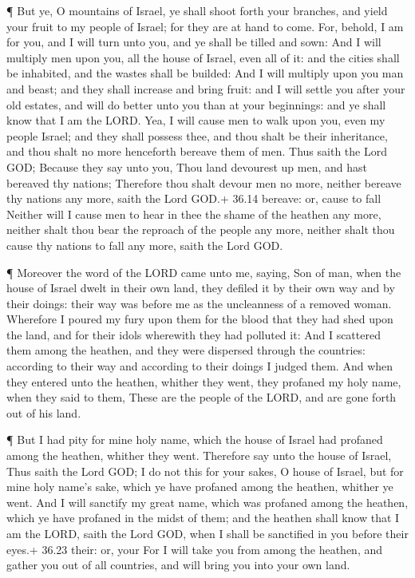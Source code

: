  ¶ But ye, O mountains of Israel, ye shall shoot forth your
branches, and yield your fruit to my people of Israel; for they are at
hand to come.  For, behold, I am for you, and I will turn
unto you, and ye shall be tilled and sown:  And I will
multiply men upon you, all the house of Israel, even all of it: and the
cities shall be inhabited, and the wastes shall be builded:
 And I will multiply upon you man and beast; and they shall
increase and bring fruit: and I will settle you after your old estates,
and will do better unto you than at your beginnings: and ye shall know
that I am the LORD.  Yea, I will cause men to walk upon
you, even my people Israel; and they shall possess thee, and thou shalt
be their inheritance, and thou shalt no more henceforth bereave them of
men.  Thus saith the Lord GOD; Because they say unto you,
Thou land devourest up men, and hast bereaved thy nations; 
Therefore thou shalt devour men no more, neither bereave thy nations any
more, saith the Lord GOD.+ 36.14 bereave: or, cause to fall
 Neither will I cause men to hear in thee the shame of the
heathen any more, neither shalt thou bear the reproach of the people any
more, neither shalt thou cause thy nations to fall any more, saith the
Lord GOD.

 ¶ Moreover the word of the LORD came unto me, saying,
 Son of man, when the house of Israel dwelt in their own
land, they defiled it by their own way and by their doings: their way
was before me as the uncleanness of a removed woman. 
Wherefore I poured my fury upon them for the blood that they had shed
upon the land, and for their idols wherewith they had polluted it:
 And I scattered them among the heathen, and they were
dispersed through the countries: according to their way and according to
their doings I judged them.  And when they entered unto the
heathen, whither they went, they profaned my holy name, when they said
to them, These are the people of the LORD, and are gone forth out of his
land.

 ¶ But I had pity for mine holy name, which the house of
Israel had profaned among the heathen, whither they went. 
Therefore say unto the house of Israel, Thus saith the Lord GOD; I do
not this for your sakes, O house of Israel, but for mine holy name's
sake, which ye have profaned among the heathen, whither ye went.
 And I will sanctify my great name, which was profaned
among the heathen, which ye have profaned in the midst of them; and the
heathen shall know that I am the LORD, saith the Lord GOD, when I shall
be sanctified in you before their eyes.+ 36.23 their: or, your
 For I will take you from among the heathen, and gather you
out of all countries, and will bring you into your own land.

